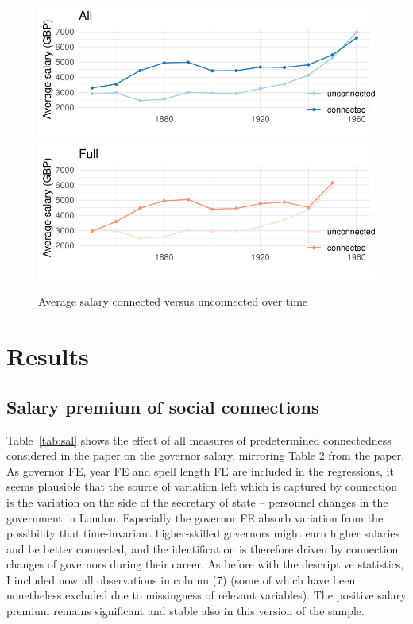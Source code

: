\documentclass[a4paper]{article}\usepackage[]{graphicx}\usepackage[]{color}
\makeatletter
\def\maxwidth{ %
  \ifdim\Gin@nat@width>\linewidth
    \linewidth
  \else
    \Gin@nat@width
  \fi
}
\makeatother
\begin{document}
\begin{figure}

{\centering \includegraphics[width=\maxwidth]{figure/plot2-1} 
\includegraphics[width=\maxwidth]{figure/plot2-2} 

}

\caption[Average salary connected versus unconnected over time]{Average salary connected versus unconnected over time}\label{fig:plot2}
\end{figure}



\section{Results}
\subsection{Salary premium of social connections}
\hspace*{5mm} Table~\ref{tab:sal} shows the effect of all measures of predetermined connectedness considered in the paper on the governor salary, mirroring Table 2 from the paper. As governor FE, year FE and spell length FE are included in the regressions, it seems plausible that the source of variation left which is captured by connection is the variation on the side of the secretary of state -- personnel changes in the government in London. Especially the governor FE absorb variation from the possibility that time-invariant higher-skilled governors might earn higher salaries and be better connected, and the identification is therefore driven by connection changes of governors during their career. As before with the descriptive statistics, I included now all observations in column (7) (some of which have been nonetheless excluded due to missingness of relevant variables). The positive salary premium remains significant and stable also in this version of the sample.
\end{document}
